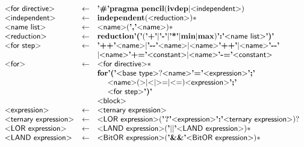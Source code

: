 \begin{figure}
  \ContinuedFloat
\[
\begin{array}{lcl}
  \pgrammar{for directive} & \gets & \plexer{\#} \pkeyword{pragma} ~ \pkeyword{pencil} (\pkeyword{ivdep} | \pgrammar{independent})\\

  \pgrammar{independent} & \gets & \pkeyword{independent} (\pgrammar{reduction})*\\

  \pgrammar{name list} & \gets & \pgrammar{name} (\plexer{,} \pgrammar{name})*\\
  \pgrammar{reduction} & \gets & \pkeyword{reduction} \plexer{(} (\plexer{+}|\plexer{-}|\plexer{*}|\pkeyword{min}|\pkeyword{max}) \plexer{:} \pgrammar{name list}\plexer{)}\\

  \pgrammar{for step} & \gets & \plexer{++} \pgrammar{name}
  | \plexer{{-}{-}} \pgrammar{name}
  | \pgrammar{name} \plexer{++}
  | \pgrammar{name} \plexer{{-}{-}}\\&&
  | \pgrammar{name} \plexer{{+}=} \pgrammar{constant}
  | \pgrammar{name} \plexer{{-}=} \pgrammar{constant}\\

  \pgrammar{for} & \gets & \pgrammar{for directive}*\\&& \pkeyword{for} \plexer{(}
  \pgrammar{base type}? \pgrammar{name} \plexer{=} \pgrammar{expression} \plexer{;}\\&&
    ~ ~ ~ ~\pgrammar{name} (\text{\textgreater}|\text{\textless}|\text{\textgreater=}|\text{\textless=}) \pgrammar{expression}\plexer{;}\\&&
    ~ ~ ~ ~\pgrammar{for step} \plexer{)}\\&&\pgrammar{block}\\

  \pgrammar{expression} & \gets & \pgrammar{ternary expression}\\

  \pgrammar{ternary expression} & \gets & \pgrammar{LOR expression}
  (\plexer{?} \pgrammar{expression} \plexer{:} \pgrammar{ternary expression})?\\

  \pgrammar{LOR expression} & \gets & \pgrammar{LAND expression} (\plexer{$||$} \pgrammar{LAND expression})*\\

  \pgrammar{LAND expression} & \gets & \pgrammar{BitOR expression} (\plexer{\&\&} \pgrammar{BitOR expression})*\\


\end{array}\]
\end{figure}
